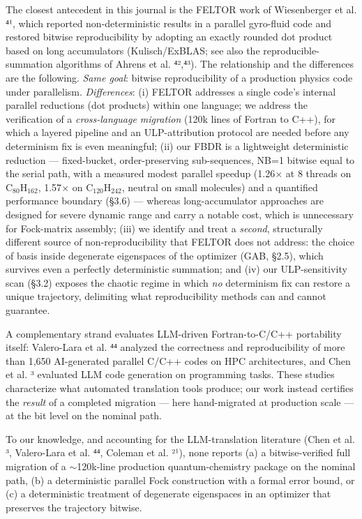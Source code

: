 \documentclass[preprint,12pt]{elsarticle}
\begin{document}
The closest antecedent in this journal is the FELTOR work of Wiesenberger et al. ⁴¹, which reported non-deterministic results in a parallel gyro-fluid code and restored bitwise reproducibility by adopting an exactly rounded dot product based on long accumulators (Kulisch/ExBLAS; see also the reproducible-summation algorithms of Ahrens et al. ⁴²,⁴³). The relationship and the differences are the following. \textit{Same goal}: bitwise reproducibility of a production physics code under parallelism. \textit{Differences}: (i) FELTOR addresses a single code's internal parallel reductions (dot products) within one language; we address the verification of a \textit{cross-language migration} (120k lines of Fortran to C++), for which a layered pipeline and an ULP-attribution protocol are needed before any determinism fix is even meaningful; (ii) our FBDR is a lightweight deterministic reduction --- fixed-bucket, order-preserving sub-sequences, NB=1 bitwise equal to the serial path, with a measured modest parallel speedup (1.26$\times$ at 8 threads on C$_{80}$H$_{162}$, 1.57$\times$ on C$_{120}$H$_{242}$, neutral on small molecules) and a quantified performance boundary (\S{}3.6) --- whereas long-accumulator approaches are designed for severe dynamic range and carry a notable cost, which is unnecessary for Fock-matrix assembly; (iii) we identify and treat a \textit{second}, structurally different source of non-reproducibility that FELTOR does not address: the choice of basis inside degenerate eigenspaces of the optimizer (GAB, \S{}2.5), which survives even a perfectly deterministic summation; and (iv) our ULP-sensitivity scan (\S{}3.2) exposes the chaotic regime in which \textit{no} determinism fix can restore a unique trajectory, delimiting what reproducibility methods can and cannot guarantee.

A complementary strand evaluates LLM-driven Fortran-to-C/C++ portability itself: Valero-Lara et al. ⁴⁴ analyzed the correctness and reproducibility of more than 1,650 AI-generated parallel C/C++ codes on HPC architectures, and Chen et al. ³ evaluated LLM code generation on programming tasks. These studies characterize what automated translation tools produce; our work instead certifies the \textit{result} of a completed migration --- here hand-migrated at production scale --- at the bit level on the nominal path.

To our knowledge, and accounting for the LLM-translation literature (Chen et al. ³, Valero-Lara et al. ⁴⁴, Coleman et al. ²¹), none reports (a) a bitwise-verified full migration of a $\sim$120k-line production quantum-chemistry package on the nominal path, (b) a deterministic parallel Fock construction with a formal error bound, or (c) a deterministic treatment of degenerate eigenspaces in an optimizer that preserves the trajectory bitwise.
\end{document}
